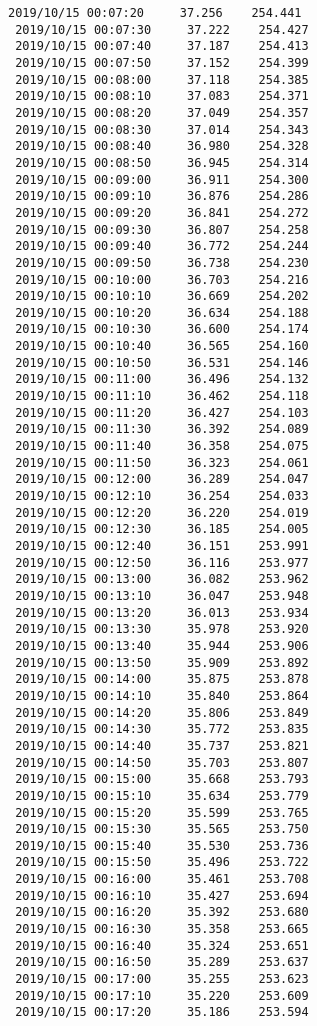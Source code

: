 \documentclass[11pt]{article}
\begin{document}
\begin{Verbatim}[commandchars=\\\{\}]
 2019/10/15 00:07:20     37.256    254.441
 2019/10/15 00:07:30     37.222    254.427
 2019/10/15 00:07:40     37.187    254.413
 2019/10/15 00:07:50     37.152    254.399
 2019/10/15 00:08:00     37.118    254.385
 2019/10/15 00:08:10     37.083    254.371
 2019/10/15 00:08:20     37.049    254.357
 2019/10/15 00:08:30     37.014    254.343
 2019/10/15 00:08:40     36.980    254.328
 2019/10/15 00:08:50     36.945    254.314
 2019/10/15 00:09:00     36.911    254.300
 2019/10/15 00:09:10     36.876    254.286
 2019/10/15 00:09:20     36.841    254.272
 2019/10/15 00:09:30     36.807    254.258
 2019/10/15 00:09:40     36.772    254.244
 2019/10/15 00:09:50     36.738    254.230
 2019/10/15 00:10:00     36.703    254.216
 2019/10/15 00:10:10     36.669    254.202
 2019/10/15 00:10:20     36.634    254.188
 2019/10/15 00:10:30     36.600    254.174
 2019/10/15 00:10:40     36.565    254.160
 2019/10/15 00:10:50     36.531    254.146
 2019/10/15 00:11:00     36.496    254.132
 2019/10/15 00:11:10     36.462    254.118
 2019/10/15 00:11:20     36.427    254.103
 2019/10/15 00:11:30     36.392    254.089
 2019/10/15 00:11:40     36.358    254.075
 2019/10/15 00:11:50     36.323    254.061
 2019/10/15 00:12:00     36.289    254.047
 2019/10/15 00:12:10     36.254    254.033
 2019/10/15 00:12:20     36.220    254.019
 2019/10/15 00:12:30     36.185    254.005
 2019/10/15 00:12:40     36.151    253.991
 2019/10/15 00:12:50     36.116    253.977
 2019/10/15 00:13:00     36.082    253.962
 2019/10/15 00:13:10     36.047    253.948
 2019/10/15 00:13:20     36.013    253.934
 2019/10/15 00:13:30     35.978    253.920
 2019/10/15 00:13:40     35.944    253.906
 2019/10/15 00:13:50     35.909    253.892
 2019/10/15 00:14:00     35.875    253.878
 2019/10/15 00:14:10     35.840    253.864
 2019/10/15 00:14:20     35.806    253.849
 2019/10/15 00:14:30     35.772    253.835
 2019/10/15 00:14:40     35.737    253.821
 2019/10/15 00:14:50     35.703    253.807
 2019/10/15 00:15:00     35.668    253.793
 2019/10/15 00:15:10     35.634    253.779
 2019/10/15 00:15:20     35.599    253.765
 2019/10/15 00:15:30     35.565    253.750
 2019/10/15 00:15:40     35.530    253.736
 2019/10/15 00:15:50     35.496    253.722
 2019/10/15 00:16:00     35.461    253.708
 2019/10/15 00:16:10     35.427    253.694
 2019/10/15 00:16:20     35.392    253.680
 2019/10/15 00:16:30     35.358    253.665
 2019/10/15 00:16:40     35.324    253.651
 2019/10/15 00:16:50     35.289    253.637
 2019/10/15 00:17:00     35.255    253.623
 2019/10/15 00:17:10     35.220    253.609
 2019/10/15 00:17:20     35.186    253.594

\end{Verbatim}
\end{document}
